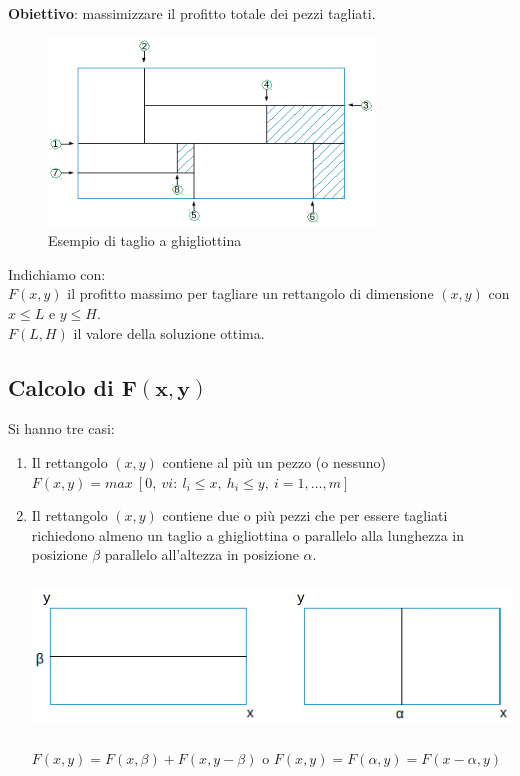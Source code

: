 \textbf{Obiettivo}: massimizzare il profitto totale dei pezzi tagliati.

\begin{figure}[h]
	\centering
	\includegraphics[height=5cm]{images/shape2.png}
	\caption{Esempio di taglio a ghigliottina}
\end{figure}
Indichiamo con:\\

$F(x,y)$ il profitto massimo per tagliare un rettangolo di dimensione $(x,y)$ con $x\le L$ e $y\le H$.\\
$F(L,H)$ il valore della soluzione ottima.

\clearpage
\subsection{Calcolo di $\boldsymbol{F(x,y)}$}
Si hanno tre casi:
\begin{enumerate}
	\item Il rettangolo $(x,y)$ contiene al più un pezzo (o nessuno) $F(x,y)=max\ [0,\ v{i}:\ l_{i}\le x,\ h_{i}\le y,\ i=1,\dots,m]$
	\item Il rettangolo $(x,y)$ contiene due o più pezzi che per essere tagliati richiedono almeno un taglio a ghigliottina o parallelo alla lunghezza in posizione $\beta$ parallelo all'altezza in posizione $\alpha$.
	\centerline{\includegraphics[height=4cm]{images/shape3.png}}
	$F(x,y)=F(x,\beta)+F(x,y-\beta)$ o $F(x,y)=F(\alpha,y)=F(x-\alpha,y)$
\end{enumerate}

